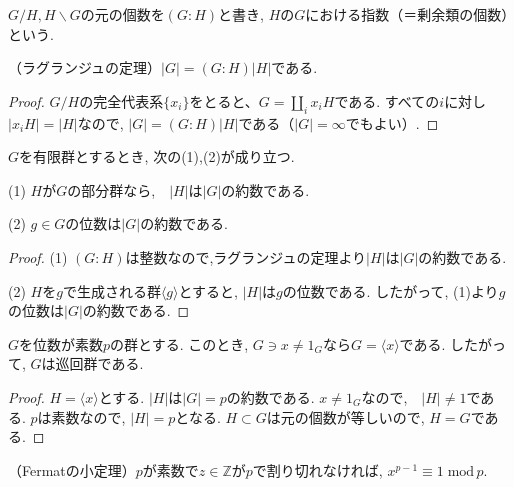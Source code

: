 \begin{dfn*}
	$G/H, H\backslash G$の元の個数を$(G:H)$と書き,
	$H$の$G$における指数（＝剰余類の個数）という.
\end{dfn*}

\begin{tcolorbox}
	\begin{thm*}
		（ラグランジュの定理）$|G|=(G:H)|H|$である.
	\end{thm*}
\end{tcolorbox}
\begin{proof}
	$G/H$の完全代表系$\{x_i\}$をとると、$G=\coprod_i x_i H$である.
	すべての$i$に対し$|x_i H|=|H|$なので,
	$|G|=(G:H)|H|$である（$|G|=\infty$でもよい）.

\end{proof}

\begin{tcolorbox}
	$G$を有限群とするとき, 次の(1),(2)が成り立つ.

	(1) $H$が$G$の部分群なら,　$|H|$は$|G|$の約数である.

	(2) $g \in G$の位数は$|G|$の約数である.
\end{tcolorbox}
\begin{proof}
	(1) $(G:H)$は整数なので,ラグランジュの定理より$|H|$は$|G|$の約数である.

	(2) $H$を$g$で生成される群$\langle g \rangle$とすると,
	$|H|$は$g$の位数である. したがって, (1)より$g$の位数は$|G|$の約数である.
\end{proof}

\begin{tcolorbox}
	\begin{prp*}
		$G$を位数が素数$p$の群とする.
		このとき, $G \ni x \neq 1_G$なら$G=\langle x \rangle$である.
		したがって, $G$は巡回群である.
	\end{prp*}
\end{tcolorbox}
\begin{proof}
	$H=\langle x \rangle$とする. $|H|$は$|G|=p$の約数である.
	$x \neq 1_G$なので,　$|H|\neq 1$である.
	$p$は素数なので, $|H|=p$となる.
	$H \subset G$は元の個数が等しいので, $H=G$である.
\end{proof}\leavevmode

\begin{tcolorbox}
	\begin{thm*}
		（Fermatの小定理）$p$が素数で$z \in \mathbb{Z}$が$p$で割り切れなければ,
		$x^{p-1}\equiv 1\; \mathrm{mod}\, p$.
	\end{thm*}
\end{tcolorbox}

